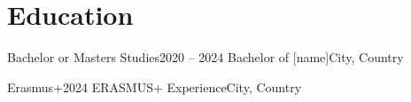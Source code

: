 \section{\faGraduationCap \hspace{0.1cm} Education}
  \resumeSubHeadingListStart
      \resumeSubheading
      {Bachelor or Masters Studies}{2020 -- 2024}
      {Bachelor of [name]}{City, Country}

      \resumeSubheading
      {Erasmus+}{2024}
      {ERASMUS+ Experience}{City, Country}
  \resumeSubHeadingListEnd